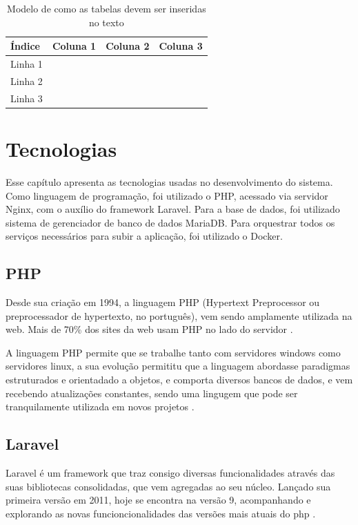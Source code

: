 \begin{table}[htb]
\caption{Modelo de como as tabelas devem ser inseridas no texto}
\label{tb:exemplo}
\centering
\begin{tabular}{|l|c|r|r|} %
\hline
Índice  & Coluna 1 & Coluna 2 & Coluna 3 \\
\hline
Linha 1 &          &          &          \\
Linha 2 &          &          &          \\
Linha 3 &          &          &          \\
\hline
\end{tabular}
\end{table}

\section{Tecnologias}
Esse capítulo apresenta as tecnologias usadas no desenvolvimento do sistema. Como linguagem de programação, foi utilizado o PHP, acessado via servidor Nginx, com o auxílio do framework Laravel. Para a base de dados, foi utilizado sistema de gerenciador de banco de dados MariaDB. Para orquestrar todos os serviços necessários para subir a aplicação, foi utilizado o Docker.

\subsection{PHP}
Desde sua criação em 1994, a linguagem PHP (Hypertext Preprocessor ou preprocessador de hypertexto, no português), vem sendo amplamente utilizada na web. Mais de 70\% dos sites da web usam PHP no lado do servidor \citep{w3techs}.

    A linguagem PHP permite que se trabalhe tanto com servidores windows como servidores linux, a sua evolução permititu que a linguagem abordasse paradigmas estruturados e orientadado a objetos, e comporta diversos bancos de dados, e vem recebendo atualizações constantes, sendo uma lingugem que pode ser tranquilamente utilizada em novos projetos \citep{phpdocs}.
    
\subsection{Laravel}
    Laravel é um framework que traz consigo diversas funcionalidades através das suas bibliotecas consolidadas, que vem agregadas ao seu núcleo. Lançado sua primeira versão em 2011, hoje se encontra na versão 9, acompanhando e explorando as novas funcioncionalidades das versões mais atuais do php \citep{laradocs}.
    
